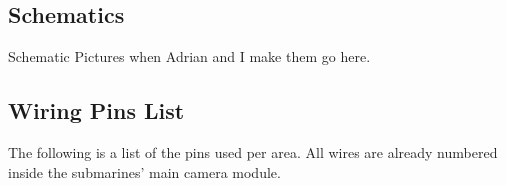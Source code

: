 \documentclass[
10pt, %
a4paper, %
oneside, %
headinclude,footinclude, %
BCOR5mm, %
]{scrartcl}
\begin{document}
\clearpage
\newpage


\subsection{Schematics}

Schematic Pictures when Adrian and I make them go here.

\subsection{Wiring Pins List}

The following is a list of the pins used per area. All wires are already numbered inside the submarines' main camera module. 
\end{document}
